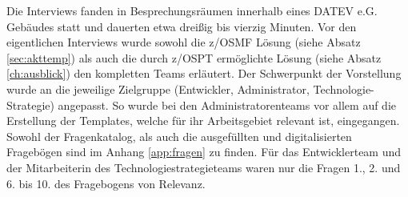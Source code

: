 Die Interviews fanden in  Besprechungsräumen innerhalb eines DATEV e.G. Gebäudes statt und dauerten etwa dreißig bis vierzig Minuten.
Vor den eigentlichen Interviews wurde sowohl die z/OSMF Lösung (siehe Absatz \ref{sec:akttemp}) als auch die durch z/OSPT ermöglichte Lösung (siehe Absatz \ref{ch:ausblick}) den kompletten Teams erläutert.
Der Schwerpunkt der Vorstellung wurde an die jeweilige Zielgruppe (Entwickler, Administrator, Technologie-Strategie) angepasst.
So wurde bei den Administratorenteams vor allem auf die Erstellung der Templates, welche für ihr Arbeitsgebiet relevant ist, eingegangen.
Sowohl der Fragenkatalog, als auch die ausgefüllten und digitalisierten Fragebögen sind im Anhang \ref{app:fragen} zu finden.
Für das Entwicklerteam und der Mitarbeiterin des Technologiestrategieteams waren nur die Fragen 1., 2. und 6. bis 10. des Fragebogens von Relevanz.
